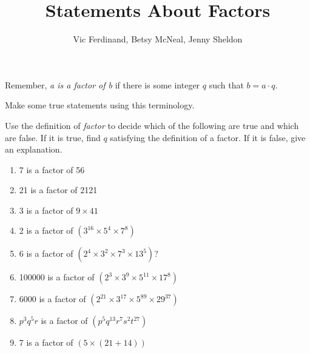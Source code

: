 \documentclass[nooutcomes]{ximera}
\title{Statements About Factors}
\author{Vic Ferdinand, Betsy McNeal, Jenny Sheldon}
\begin{document}
\begin{abstract} \end{abstract}
\maketitle




Remember, \emph{a is a factor of b} if there is some integer $q$ such that $b = a \cdot q$.
\begin{problem}
 Make some true statements using this terminology.
\end{problem}

\begin{problem}
Use the definition of \emph{factor} to decide which of the following are true and which are false. If it is true, find $q$ satisfying the definition of a factor. If it is false, give an explanation.

\begin{enumerate}
\item 7 is a factor of 56 
\item \label{Statementsb} 21 is a factor of 2121
\item \label{Statementsc} 3 is a factor of $9 \times 41$
\item \label{Statementsd} 2 is a factor of $(3^{16} \times 5^4 \times 7^8)$
\item \label{Statementse} 6 is a factor of $(2^4 \times 3^2 \times 7^3 \times 13^5)$?
\item \label{Statementsf} 100000 is a factor of  $(2^3 \times 3^9 \times 5^{11} \times17^8)$
\item \label{Statementsg} 6000  is a factor of  $(2^{21} \times 3^{17} \times 5^{89} \times 29^{37})$
\item \label{Statementsh} $p^3q^5r$  is a factor of $(p^5q^{13}r^7s^2t^{27}) $
\item \label{Statementsi} 7 is a factor of $(5 \times (21+14))$
\end{enumerate}
\end{problem}
\end{document}
